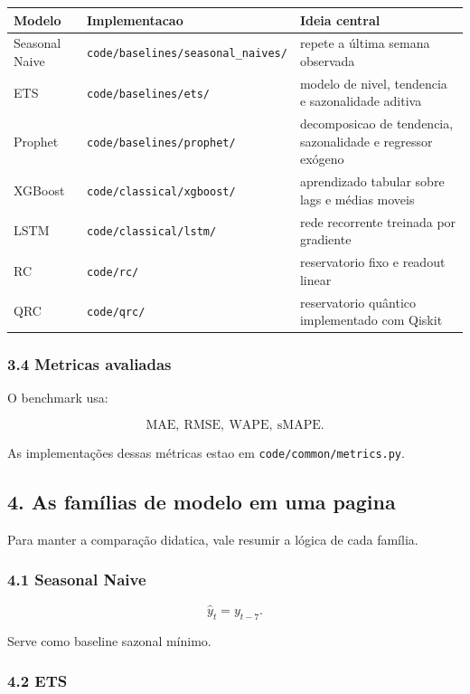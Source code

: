 \documentclass[12pt]{article}
\begin{document}
\begin{longtable}[]{@{}lll@{}}
\toprule\noalign{}
Modelo & Implementacao & Ideia central \\
\midrule\noalign{}
\endhead
\bottomrule\noalign{}
\endlastfoot
Seasonal Naive & \texttt{code/baselines/seasonal\_naives/} & repete a última semana observada \\
ETS & \texttt{code/baselines/ets/} & modelo de nivel, tendencia e sazonalidade aditiva \\
Prophet & \texttt{code/baselines/prophet/} & decomposicao de tendencia, sazonalidade e regressor exógeno \\
XGBoost & \texttt{code/classical/xgboost/} & aprendizado tabular sobre lags e médias moveis \\
LSTM & \texttt{code/classical/lstm/} & rede recorrente treinada por gradiente \\
RC & \texttt{code/rc/} & reservatorio fixo e readout linear \\
QRC & \texttt{code/qrc/} & reservatorio quântico implementado com Qiskit \\
\end{longtable}

\subsubsection{3.4 Metricas avaliadas}\label{34-metricas-avaliadas}

O benchmark usa:

\[
\mathrm{MAE},\ \mathrm{RMSE},\ \mathrm{WAPE},\ \mathrm{sMAPE}.
\]

As implementações dessas métricas estao em \texttt{code/common/metrics.py}.

\subsection{4. As famílias de modelo em uma pagina}\label{4-as-famuxedlias-de-modelo-em-uma-pagina}

Para manter a comparação didatica, vale resumir a lógica de cada família.

\subsubsection{4.1 Seasonal Naive}\label{41-seasonal-naive}

\[
\hat{y}_t = y_{t-7}.
\]

Serve como baseline sazonal mínimo.

\subsubsection{4.2 ETS}\label{42-ets}
\end{document}
